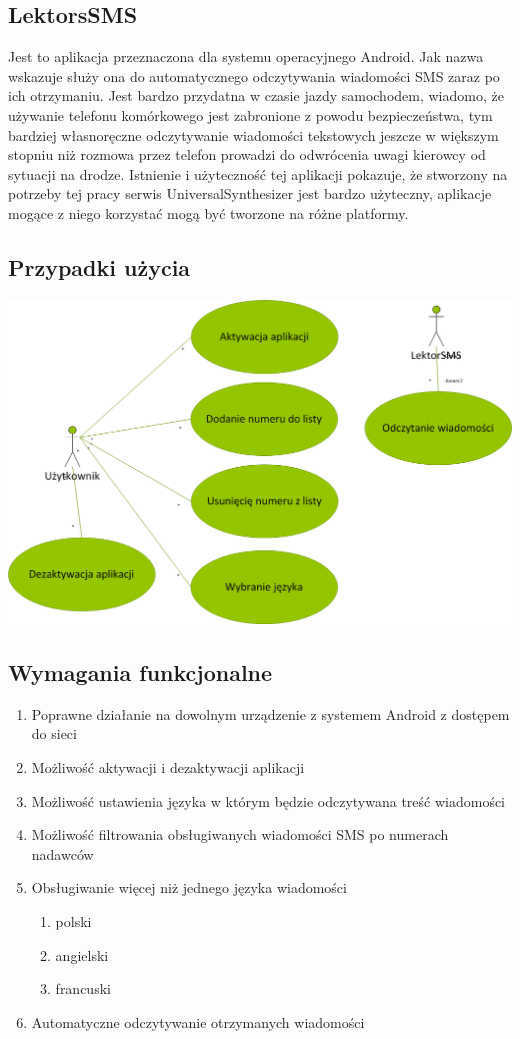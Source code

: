 \subsection{LektorsSMS}
Jest to aplikacja przeznaczona dla systemu operacyjnego Android. Jak nazwa wskazuje służy ona do automatycznego odczytywania wiadomości SMS zaraz po ich otrzymaniu. Jest bardzo przydatna w czasie jazdy samochodem, wiadomo, że używanie telefonu komórkowego jest zabronione z powodu bezpieczeństwa, tym bardziej własnoręczne odczytywanie wiadomości tekstowych jeszcze w większym stopniu niż rozmowa przez telefon prowadzi do odwrócenia uwagi kierowcy od sytuacji na drodze. Istnienie i użyteczność tej aplikacji pokazuje, że stworzony na potrzeby tej pracy serwis UniversalSynthesizer jest bardzo użyteczny, aplikacje mogące z niego korzystać mogą być tworzone na różne platformy.
\subsection{Przypadki użycia}
\includegraphics[scale=0.55]{useCaseLektorSMS.png} 
\subsection{Wymagania funkcjonalne}
\begin{enumerate}
	\item Poprawne działanie na dowolnym urządzenie z systemem Android z dostępem do sieci
	\item Możliwość aktywacji i dezaktywacji aplikacji
	\item Możliwość ustawienia języka w którym będzie odczytywana treść wiadomości
	\item Możliwość filtrowania obsługiwanych wiadomości SMS po numerach nadawców 
	\item Obsługiwanie więcej niż jednego języka wiadomości
		\begin{enumerate}
			\item polski
			\item angielski
			\item francuski
		\end{enumerate}
	\item Automatyczne odczytywanie otrzymanych wiadomości
\end{enumerate}



